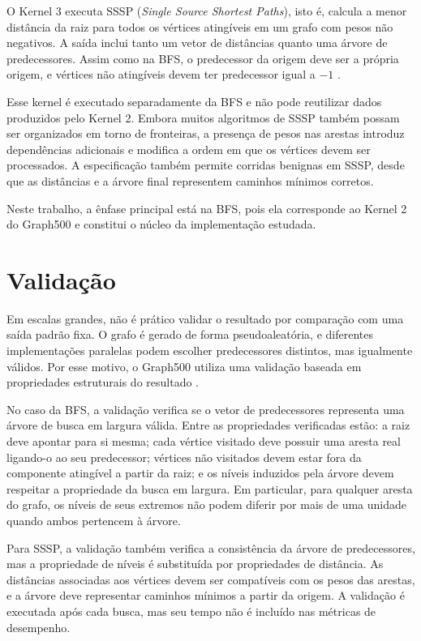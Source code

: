 O Kernel 3 executa SSSP (\textit{Single Source Shortest Paths}), isto é, calcula a menor distância da raiz para todos os vértices atingíveis em um grafo com pesos não negativos. A saída inclui tanto um vetor de distâncias quanto uma árvore de predecessores. Assim como na BFS, o predecessor da origem deve ser a própria origem, e vértices não atingíveis devem ter predecessor igual a $-1$ \cite{graph500spec, cormenalgorithms}.

Esse kernel é executado separadamente da BFS e não pode reutilizar dados produzidos pelo Kernel 2. Embora muitos algoritmos de SSSP também possam ser organizados em torno de fronteiras, a presença de pesos nas arestas introduz dependências adicionais e modifica a ordem em que os vértices devem ser processados. A especificação também permite corridas benignas em SSSP, desde que as distâncias e a árvore final representem caminhos mínimos corretos.

Neste trabalho, a ênfase principal está na BFS, pois ela corresponde ao Kernel 2 do Graph500 e constitui o núcleo da implementação estudada.

\section{Validação}
\label{sec:graph500-validacao}

Em escalas grandes, não é prático validar o resultado por comparação com uma saída padrão fixa. O grafo é gerado de forma pseudoaleatória, e diferentes implementações paralelas podem escolher predecessores distintos, mas igualmente válidos. Por esse motivo, o Graph500 utiliza uma validação baseada em propriedades estruturais do resultado \cite{graph500spec}.

No caso da BFS, a validação verifica se o vetor de predecessores representa uma árvore de busca em largura válida. Entre as propriedades verificadas estão: a raiz deve apontar para si mesma; cada vértice visitado deve possuir uma aresta real ligando-o ao seu predecessor; vértices não visitados devem estar fora da componente atingível a partir da raiz; e os níveis induzidos pela árvore devem respeitar a propriedade da busca em largura. Em particular, para qualquer aresta do grafo, os níveis de seus extremos não podem diferir por mais de uma unidade quando ambos pertencem à árvore.

Para SSSP, a validação também verifica a consistência da árvore de predecessores, mas a propriedade de níveis é substituída por propriedades de distância. As distâncias associadas aos vértices devem ser compatíveis com os pesos das arestas, e a árvore deve representar caminhos mínimos a partir da origem. A validação é executada após cada busca, mas seu tempo não é incluído nas métricas de desempenho.



